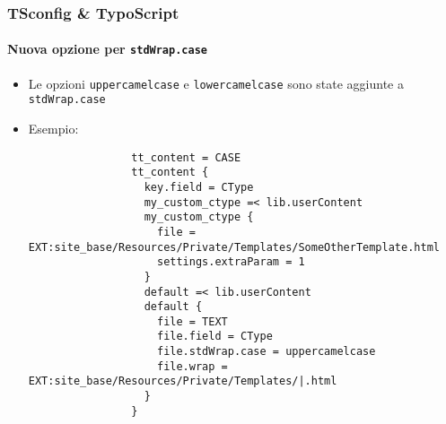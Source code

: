 \begin{frame}[fragile]
	\frametitle{TSconfig \& TypoScript}
	\framesubtitle{Nuova opzione per \texttt{stdWrap.case}}

	\lstset{basicstyle=\tiny\ttfamily}

	\begin{itemize}

		\item Le opzioni \texttt{uppercamelcase} e \texttt{lowercamelcase} sono state aggiunte
			a \texttt{stdWrap.case}

		\item Esempio:

			\begin{lstlisting}
				tt_content = CASE
				tt_content {
				  key.field = CType
				  my_custom_ctype =< lib.userContent
				  my_custom_ctype {
				    file = EXT:site_base/Resources/Private/Templates/SomeOtherTemplate.html
				    settings.extraParam = 1
				  }
				  default =< lib.userContent
				  default {
				    file = TEXT
				    file.field = CType
				    file.stdWrap.case = uppercamelcase
				    file.wrap = EXT:site_base/Resources/Private/Templates/|.html
				  }
				}
			\end{lstlisting}

	\end{itemize}

\end{frame}


